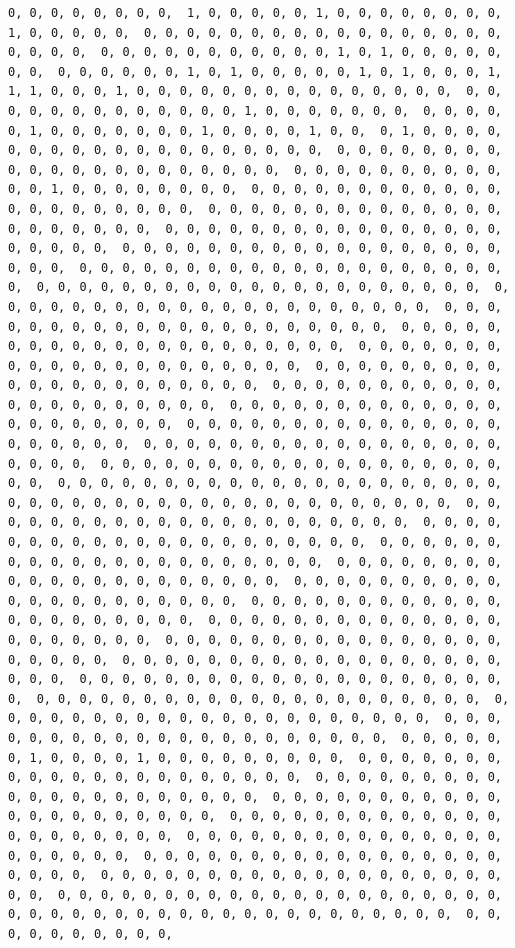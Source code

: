 \documentclass[
]{article}
\begin{document}
\begin{verbatim}
0, 0, 0, 0, 0, 0, 0, 0,  1, 0, 0, 0, 0, 0, 1, 0, 0, 0, 0, 0, 0, 0, 0, 1, 0, 0, 0, 0, 0,  0, 0, 0, 0, 0, 0, 0, 0, 0, 0, 0, 0, 0, 0, 0, 0, 0, 0, 0, 0, 0,  0, 0, 0, 0, 0, 0, 0, 0, 0, 0, 0, 1, 0, 1, 0, 0, 0, 0, 0, 0, 0,  0, 0, 0, 0, 0, 0, 1, 0, 1, 0, 0, 0, 0, 0, 1, 0, 1, 0, 0, 0, 1,  1, 1, 0, 0, 0, 1, 0, 0, 0, 0, 0, 0, 0, 0, 0, 0, 0, 0, 0, 0, 0,  0, 0, 0, 0, 0, 0, 0, 0, 0, 0, 0, 0, 0, 1, 0, 0, 0, 0, 0, 0, 0,  0, 0, 0, 0, 0, 1, 0, 0, 0, 0, 0, 0, 0, 1, 0, 0, 0, 0, 1, 0, 0,  0, 1, 0, 0, 0, 0, 0, 0, 0, 0, 0, 0, 0, 0, 0, 0, 0, 0, 0, 0, 0,  0, 0, 0, 0, 0, 0, 0, 0, 0, 0, 0, 0, 0, 0, 0, 0, 0, 0, 0, 0, 0,  0, 0, 0, 0, 0, 0, 0, 0, 0, 0, 0, 0, 1, 0, 0, 0, 0, 0, 0, 0, 0,  0, 0, 0, 0, 0, 0, 0, 0, 0, 0, 0, 0, 0, 0, 0, 0, 0, 0, 0, 0, 0,  0, 0, 0, 0, 0, 0, 0, 0, 0, 0, 0, 0, 0, 0, 0, 0, 0, 0, 0, 0, 0,  0, 0, 0, 0, 0, 0, 0, 0, 0, 0, 0, 0, 0, 0, 0, 0, 0, 0, 0, 0, 0,  0, 0, 0, 0, 0, 0, 0, 0, 0, 0, 0, 0, 0, 0, 0, 0, 0, 0, 0, 0, 0,  0, 0, 0, 0, 0, 0, 0, 0, 0, 0, 0, 0, 0, 0, 0, 0, 0, 0, 0, 0, 0,  0, 0, 0, 0, 0, 0, 0, 0, 0, 0, 0, 0, 0, 0, 0, 0, 0, 0, 0, 0, 0,  0, 0, 0, 0, 0, 0, 0, 0, 0, 0, 0, 0, 0, 0, 0, 0, 0, 0, 0, 0, 0,  0, 0, 0, 0, 0, 0, 0, 0, 0, 0, 0, 0, 0, 0, 0, 0, 0, 0, 0, 0, 0,  0, 0, 0, 0, 0, 0, 0, 0, 0, 0, 0, 0, 0, 0, 0, 0, 0, 0, 0, 0, 0,  0, 0, 0, 0, 0, 0, 0, 0, 0, 0, 0, 0, 0, 0, 0, 0, 0, 0, 0, 0, 0,  0, 0, 0, 0, 0, 0, 0, 0, 0, 0, 0, 0, 0, 0, 0, 0, 0, 0, 0, 0, 0,  0, 0, 0, 0, 0, 0, 0, 0, 0, 0, 0, 0, 0, 0, 0, 0, 0, 0, 0, 0, 0,  0, 0, 0, 0, 0, 0, 0, 0, 0, 0, 0, 0, 0, 0, 0, 0, 0, 0, 0, 0, 0,  0, 0, 0, 0, 0, 0, 0, 0, 0, 0, 0, 0, 0, 0, 0, 0, 0, 0, 0, 0, 0,  0, 0, 0, 0, 0, 0, 0, 0, 0, 0, 0, 0, 0, 0, 0, 0, 0, 0, 0, 0, 0,  0, 0, 0, 0, 0, 0, 0, 0, 0, 0, 0, 0, 0, 0, 0, 0, 0, 0, 0, 0, 0,  0, 0, 0, 0, 0, 0, 0, 0, 0, 0, 0, 0, 0, 0, 0, 0, 0, 0, 0, 0, 0,  0, 0, 0, 0, 0, 0, 0, 0, 0, 0, 0, 0, 0, 0, 0, 0, 0, 0, 0, 0, 0,  0, 0, 0, 0, 0, 0, 0, 0, 0, 0, 0, 0, 0, 0, 0, 0, 0, 0, 0, 0, 0,  0, 0, 0, 0, 0, 0, 0, 0, 0, 0, 0, 0, 0, 0, 0, 0, 0, 0, 0, 0, 0,  0, 0, 0, 0, 0, 0, 0, 0, 0, 0, 0, 0, 0, 0, 0, 0, 0, 0, 0, 0, 0,  0, 0, 0, 0, 0, 0, 0, 0, 0, 0, 0, 0, 0, 0, 0, 0, 0, 0, 0, 0, 0,  0, 0, 0, 0, 0, 0, 0, 0, 0, 0, 0, 0, 0, 0, 0, 0, 0, 0, 0, 0, 0,  0, 0, 0, 0, 0, 0, 0, 0, 0, 0, 0, 0, 0, 0, 0, 0, 0, 0, 0, 0, 0,  0, 0, 0, 0, 0, 0, 0, 0, 0, 0, 0, 0, 0, 0, 0, 0, 0, 0, 0, 0, 0,  0, 0, 0, 0, 0, 0, 0, 0, 0, 0, 0, 0, 0, 0, 0, 0, 0, 0, 0, 0, 0,  0, 0, 0, 0, 0, 0, 0, 0, 0, 0, 0, 0, 0, 0, 0, 0, 0, 0, 0, 0, 0,  0, 0, 0, 0, 0, 0, 0, 0, 0, 0, 0, 0, 0, 0, 0, 0, 0, 0, 0, 0, 0,  0, 0, 0, 0, 0, 0, 0, 0, 0, 0, 0, 0, 0, 0, 0, 0, 0, 0, 0, 0, 0,  0, 0, 0, 0, 0, 0, 0, 0, 0, 0, 0, 0, 0, 0, 0, 0, 0, 0, 0, 0, 0,  0, 0, 0, 0, 0, 0, 0, 0, 0, 0, 0, 0, 0, 0, 0, 0, 0, 0, 0, 0, 0,  0, 0, 0, 0, 0, 0, 1, 0, 0, 0, 0, 1, 0, 0, 0, 0, 0, 0, 0, 0, 0,  0, 0, 0, 0, 0, 0, 0, 0, 0, 0, 0, 0, 0, 0, 0, 0, 0, 0, 0, 0, 0,  0, 0, 0, 0, 0, 0, 0, 0, 0, 0, 0, 0, 0, 0, 0, 0, 0, 0, 0, 0, 0,  0, 0, 0, 0, 0, 0, 0, 0, 0, 0, 0, 0, 0, 0, 0, 0, 0, 0, 0, 0, 0,  0, 0, 0, 0, 0, 0, 0, 0, 0, 0, 0, 0, 0, 0, 0, 0, 0, 0, 0, 0, 0,  0, 0, 0, 0, 0, 0, 0, 0, 0, 0, 0, 0, 0, 0, 0, 0, 0, 0, 0, 0, 0,  0, 0, 0, 0, 0, 0, 0, 0, 0, 0, 0, 0, 0, 0, 0, 0, 0, 0, 0, 0, 0,  0, 0, 0, 0, 0, 0, 0, 0, 0, 0, 0, 0, 0, 0, 0, 0, 0, 0, 0, 0, 0,  0, 0, 0, 0, 0, 0, 0, 0, 0, 0, 0, 0, 0, 0, 0, 0, 0, 0, 0, 0, 0,  0, 0, 0, 0, 0, 0, 0, 0, 0, 0, 0, 0, 0, 0, 0, 0, 0, 0, 0, 0, 0,  0, 0, 0, 0, 0, 0, 0, 0, 0, 0, 
\end{verbatim}
\end{document}
